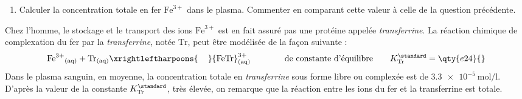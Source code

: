 \documentclass[a4paper,french,bookmarks]{article}
\begin{document}
    \begin{enumerate}[resume]
        \item Calculer la concentration totale en fer $\text{Fe}^{3+}$ dans le plasma. Commenter en comparant cette valeur à celle de la question précédente.
        
        \noafter
        \nobefore\yesafter
    \end{enumerate}

    Chez l'homme, le stockage et le transport des ions $\text{Fe}^{3+}$ est en fait assuré pas une protéine appelée \emph{transferrine}. La réaction chimique de complexation du fer par la \emph{transferrine}, notée $\text{Tr}$, peut être modélisée de la façon suivante :
    \[ {\text{Fe}^{3+}}_\text{(aq)} + \text{Tr}_\text{(aq)} \xrightleftharpoons{\hspace{0.4cm}} {\text{Fe}\text{Tr}}^{3+}_\text{(aq)} \qquad\qquad\text{de constante d'équilibre}\qquad K_\text{Tr}^\standard = \qty{e24}{}\]
    Dans le plasma sanguin, en moyenne, la concentration totale en \emph{transferrine} sous forme libre ou complexée est de $\qty{3.3e-5}{\mol\per\litre}$. D'après la valeur de la constante $K_\text{Tr}^\standard$, très élevée, on remarque que la réaction entre les ions du fer et la transferrine est totale.
\end{document}
